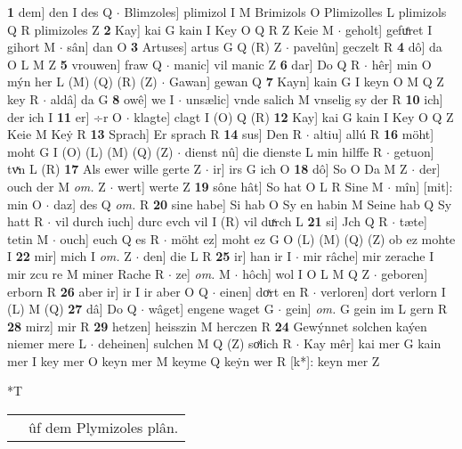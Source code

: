 \documentclass[8pt,a4paper,notitlepage]{article}
\begin{document}
\begin{table}[ht]
\begin{minipage}[t]{0.5\linewidth}
\textbf{1} dem] den I des Q  $\cdot$ Blimzoles] plimizol I M Brimizols O Plimizolles L plimizols Q R plimizoles Z \textbf{2} Kay] kai G kain I Key O Q R Z Keie M  $\cdot$ geholt] gefuͤret I gihort M  $\cdot$ sân] dan O \textbf{3} Artuses] artus G Q (R) Z  $\cdot$ pavelûn] geczelt R \textbf{4} dô] da O L M Z \textbf{5} vrouwen] fraw Q  $\cdot$ manic] vil manic Z \textbf{6} dar] Do Q R  $\cdot$ hêr] min O mýn her L (M) (Q) (R) (Z)  $\cdot$ Gawan] gewan Q \textbf{7} Kayn] kain G I keyn O M Q Z key R  $\cdot$ aldâ] da G \textbf{8} owê] we I  $\cdot$ unsælic] vnde salich M vnselig sy der R \textbf{10} ich] der ich I \textbf{11} er] ÷r O  $\cdot$ klagte] clagt I (O) Q (R) \textbf{12} Kay] kai G kain I Key O Q Z Keie M Keẏ R \textbf{13} Sprach] Er sprach R \textbf{14} sus] Den R  $\cdot$ altiu] allú R \textbf{16} möht] moht G I (O) (L) (M) (Q) (Z)  $\cdot$ dienst nû] die dienste L min hilffe R  $\cdot$ getuon] tvͯn L (R) \textbf{17} Als ewer wille gerte Z  $\cdot$ ir] irs G ich O \textbf{18} dô] So O Da M Z  $\cdot$ der] ouch der M \textit{om.} Z  $\cdot$ wert] werte Z \textbf{19} sône hât] So hat O L R Sine M  $\cdot$ mîn] [mit]: min O  $\cdot$ daz] des Q \textit{om.} R \textbf{20} sine habe] Si hab O Sy en habin M Seine hab Q Sy hatt R  $\cdot$ vil durch iuch] durc evch vil I (R) vil duͯrch L \textbf{21} si] Jch Q R  $\cdot$ tæte] tetin M  $\cdot$ ouch] euch Q es R  $\cdot$ möht ez] moht ez G O (L) (M) (Q) (Z) ob ez mohte I \textbf{22} mir] mich I \textit{om.} Z  $\cdot$ den] die L R \textbf{25} ir] han ir I  $\cdot$ mir râche] mir zerache I mir zcu re M miner Rache R  $\cdot$ ze] \textit{om.} M  $\cdot$ hôch] wol I O L M Q Z  $\cdot$ geboren] erborn R \textbf{26} aber ir] ir I ir aber O Q  $\cdot$ einen] doͯrt en R  $\cdot$ verloren] dort verlorn I (L) M (Q) \textbf{27} dâ] Do Q  $\cdot$ wâget] engene waget G  $\cdot$ gein] \textit{om.} G gein im L gern R \textbf{28} mirz] mir R \textbf{29} hetzen] heisszin M herczen R \textbf{24} Gewýnnet solchen kaýen niemer mere L  $\cdot$ deheinen] sulchen M Q (Z) soͯlich R  $\cdot$ Kay mêr] kai mer G kain mer I key mer O keyn mer M keyme Q keẏn wer R [k*]: keyn mer Z \newline
\end{minipage}
\hspace{0.5cm}
\begin{minipage}[t]{0.5\linewidth}
\small
\begin{center}*T
\end{center}
\begin{tabular}{rl}
 & ûf dem Plymizoles plân.\\ 

\end{tabular}
\end{minipage}
\end{table}
\end{document}
